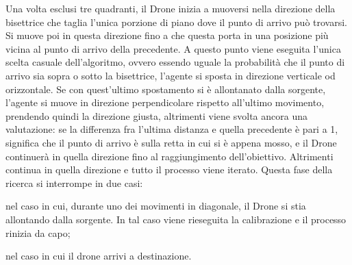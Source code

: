 Una volta esclusi tre quadranti, il Drone inizia a muoversi nella direzione della bisettrice che taglia l'unica porzione di piano dove il punto di arrivo può trovarsi. Si muove poi in questa direzione fino a che questa porta in una posizione più vicina al punto di arrivo della precedente. A questo punto viene eseguita l'unica scelta casuale dell'algoritmo, ovvero essendo uguale la probabilità che il punto di arrivo sia sopra o sotto la bisettrice, l'agente si sposta in direzione verticale od orizzontale. Se con quest'ultimo spostamento si è allontanato dalla sorgente, l'agente si muove in direzione perpendicolare rispetto all'ultimo movimento, prendendo quindi la direzione giusta, altrimenti viene svolta ancora una valutazione: se la differenza fra l'ultima distanza e quella precedente è pari a 1, significa che il punto di arrivo è sulla retta in cui si è appena mosso, e il Drone continuerà in quella direzione fino al raggiungimento dell'obiettivo. Altrimenti continua in quella direzione e tutto il processo viene iterato. Questa fase della ricerca si interrompe in due casi: 

nel caso in cui, durante uno dei movimenti in diagonale, il Drone si stia allontando dalla sorgente. In tal caso viene rieseguita la calibrazione e il processo rinizia da capo;

nel caso in cui il drone arrivi a destinazione.
